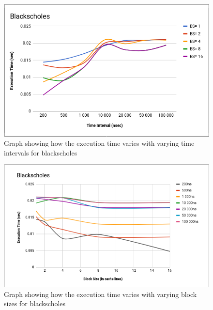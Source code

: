 \documentclass{listhesis}
\begin{document}
\begin{figure}
  \includegraphics[width=\linewidth]{Blacksc_var_bs_t.png}
  \centering
  \caption{Graph showing how the execution time varies with varying time intervals for blackscholes}
  \label{fig:Blacksc_var_bs_t.png}
\end{figure}

\begin{figure}
  \includegraphics[width=\linewidth]{Blacksc_var_bs_fordiff_t.png}
  \centering
  \caption{Graph showing how the execution time varies with varying block sizes for blackscholes}
  \label{fig:Blacksc_var_bs_fordiff_t.png}
\end{figure}
\end{document}
